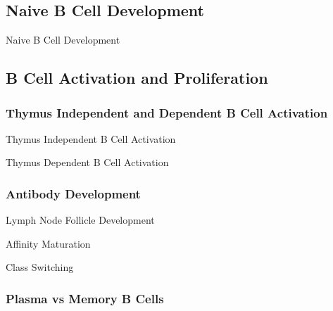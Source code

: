 \documentclass[10pt]{article}
\begin{document}
  \subsection{Naive B Cell Development}

    \begin{core}{Naive B Cell Development}

    \end{core}

  \subsection{B Cell Activation and Proliferation}

    \subsubsection{Thymus Independent and Dependent B Cell Activation}

      \begin{core}{Thymus Independent B Cell Activation}

      \end{core}

      \begin{core}{Thymus Dependent B Cell Activation}

      \end{core}

    \subsubsection{Antibody Development}

      \begin{core}{Lymph Node Follicle Development}

      \end{core}

      \begin{core}{Affinity Maturation}

      \end{core}

      \begin{core}{Class Switching}

      \end{core}

    \subsubsection{Plasma vs Memory B Cells}
\end{document}
